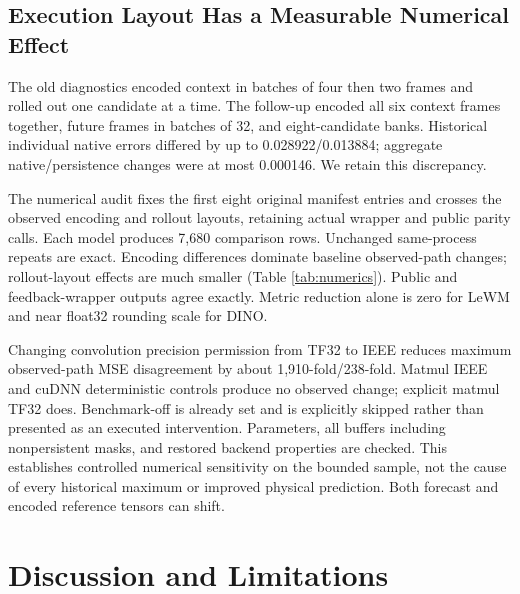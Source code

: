 \subsection{Execution Layout Has a Measurable Numerical Effect}
\label{sec:numerics}
The old diagnostics encoded context in batches of four then two frames and
rolled out one candidate at a time. The follow-up encoded all six context frames
together, future frames in batches of 32, and eight-candidate banks. Historical
individual native errors differed by up to 0.028922/0.013884; aggregate
native/persistence changes were at most 0.000146. We retain this discrepancy.

The numerical audit fixes the first eight original manifest entries and crosses
the observed encoding and rollout layouts, retaining actual wrapper and public
parity calls. Each model produces 7,680 comparison rows. Unchanged same-process
repeats are exact. Encoding differences dominate baseline observed-path changes;
rollout-layout effects are much smaller (Table \ref{tab:numerics}). Public and
feedback-wrapper outputs agree exactly. Metric reduction alone is zero for
LeWM and near float32 rounding scale for DINO.

\begin{table}[t]
\caption{Maximum absolute change in horizon-8 native MSE on the fixed eight-root
numerical sample. These are arithmetic/layout contrasts, not physical accuracy.
Convolution IEEE is a controlled precision permission, not a new selected model.}
\label{tab:numerics}
\centering\small

\end{table}

Changing convolution precision permission from TF32 to IEEE reduces maximum
observed-path MSE disagreement by about 1,910-fold/238-fold. Matmul IEEE and
cuDNN deterministic controls produce no observed change; explicit matmul TF32
does. Benchmark-off is already set and is explicitly skipped rather than
presented as an executed intervention. Parameters, all buffers including
nonpersistent masks, and restored backend properties are checked. This
establishes controlled numerical sensitivity on the bounded sample, not the
cause of every historical maximum or improved physical prediction. Both
forecast and encoded reference tensors can shift.

\section{Discussion and Limitations}
\label{sec:discussion}
